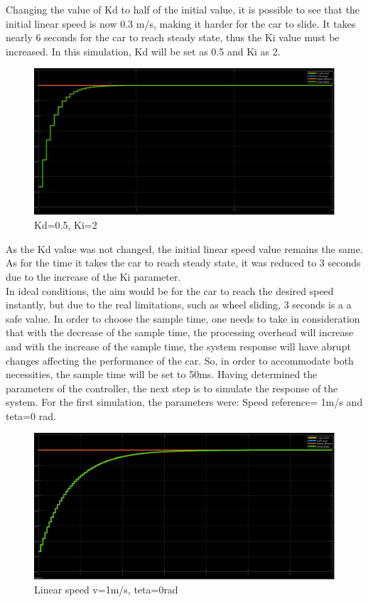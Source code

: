 Changing the value of Kd to half of the initial value, it is possible to see that the initial linear speed is now 0.3 m/s, making it harder for the car to slide. It takes nearly 6 seconds for the car to reach steady state, thus the Ki value must be increased.
\newpage
In this simulation, Kd will be set as 0.5 and Ki as 2.
\begin{figure}[!h]
\centering
\includegraphics[width=1.0\textwidth]{./img/pid052.png}
\caption {\label{fig:pid1 - p05i2}Kd=0.5, Ki=2}
\end{figure}
As the Kd value was not changed, the initial linear speed value remains the same. As for the time it takes the car to reach steady state, it was reduced to 3 seconds due to the increase of the Ki parameter.\\
In ideal conditions, the aim would be for the car to reach the desired speed instantly, but due to the real limitations, such as wheel sliding, 3 seconds is a a safe value.
\newline
In order to choose the sample time, one needs to take in consideration that with the decrease of the sample time, the processing overhead will increase and with the increase of the sample time, the system response will have abrupt changes affecting the performance of the car. So, in order to accommodate both necessities, the sample time will be set to 50ms.
\newpage
Having determined the parameters of the controller, the next step is to simulate the response of the system.
For the first simulation, the parameters were: Speed reference= 1m/s and teta=0 rad.\\
\begin{figure}[!h]
\centering
\includegraphics[width=1.0\textwidth]{./img/vel10.png}
\caption {\label{fig:sim1 - vel}Linear speed v=1m/s, teta=0rad}
\end{figure}
